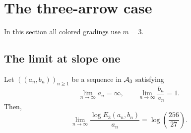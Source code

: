 \section{The three-arrow case}\label{sec:three-arrow}
In this section all colored gradings use $m=3$.

\subsection{The limit at slope one}\label{sec:central}

\begin{corollary}\label{cor:central}
Let $((a_n,b_n))_{n\ge1}$ be a sequence in $\mathcal A_3$ satisfying
\[
 \lim_{n\to\infty}a_n=\infty,\qquad
 \lim_{n\to\infty}\frac{b_n}{a_n}=1.
\]
Then,
\[
 \lim_{n\to\infty}\frac{\log E_3(a_n,b_n)}{a_n}
 =\log\left(\frac{256}{27}\right).
\]
\end{corollary}
